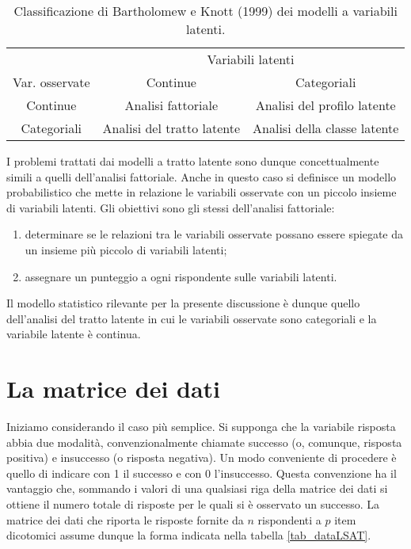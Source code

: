 \begin{table}[h!]
\caption{Classificazione di Bartholomew e Knott (1999) dei modelli a variabili latenti.}
\label{tab:Bartholomew_Knott}
\centering
\begin{tabular}{ccc}
\hline
& \multicolumn{2}{c}{Variabili latenti} \\
\cline{2-3}
Var. osservate & Continue & Categoriali \\
\hline
Continue     & Analisi fattoriale       & Analisi del profilo latente \\
Categoriali  & Analisi del tratto latente &  Analisi della classe latente \\
\hline
\end{tabular}

\end{table}

I problemi trattati dai modelli a tratto latente sono dunque concettualmente
simili a quelli dell'analisi fattoriale. 
Anche in questo caso si definisce un modello probabilistico che mette in relazione
le variabili osservate con un piccolo insieme di variabili
latenti.  
Gli obiettivi sono gli stessi dell'analisi fattoriale:
\begin{enumerate}
\item determinare se le relazioni tra le variabili osservate possano essere spiegate da un insieme più piccolo di variabili latenti;
\item assegnare un punteggio a ogni rispondente sulle variabili latenti.
\end{enumerate}
Il modello statistico rilevante per la presente discussione è dunque quello dell'analisi del tratto latente in cui le variabili osservate sono categoriali e la variabile latente è continua.

\section{La matrice dei dati}

Iniziamo considerando il caso più semplice. 
Si supponga che la variabile risposta abbia due modalità, convenzionalmente chiamate successo (o, comunque, risposta positiva) e insuccesso (o risposta negativa).  
Un modo conveniente di procedere è quello di indicare con 1 il successo e con 0 l'insuccesso.
Questa convenzione ha il vantaggio che, sommando i valori di una qualsiasi riga della matrice dei dati si ottiene il numero totale di risposte per le quali si è osservato un successo. 
La matrice dei dati che riporta le risposte fornite da $n$ rispondenti a $p$ item dicotomici assume dunque la forma indicata nella tabella \ref{tab_dataLSAT}.

